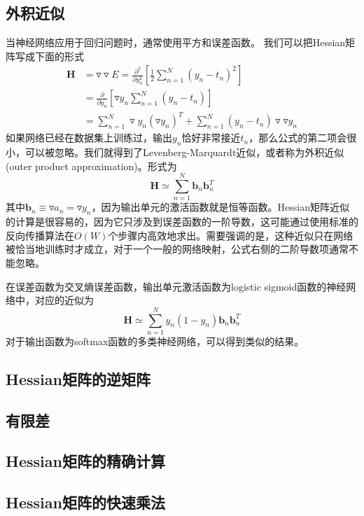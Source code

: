 \subsection*{外积近似}
当神经网络应用于回归问题时，通常使用平方和误差函数。
我们可以把Hessian矩阵写成下面的形式
\begin{equation}
	\begin{aligned}
		\boldsymbol{H}&=\triangledown\triangledown E=\frac{\partial^2}{\partial y_n^2}\left[\frac{1}{2}\sum_{n=1}^{N}(y_n-t_n)^2 \right]\\
		&=\frac{\partial}{\partial y_n}\left[\triangledown y_n\sum_{n=1}^{N}(y_n-t_n) \right]\\
		&=\sum_{n=1}^{N}\triangledown y_n(\triangledown y_n)^T+\sum_{n=1}^{N}(y_n-t_n)\triangledown\triangledown y_n
	\end{aligned}
\end{equation}
如果网络已经在数据集上训练过，输出$y_n$恰好非常接近$t_n$，那么公式的第二项会很小，可以被忽略。我们就得到了Levenberg-Marquardt近似，或者称为外积近似(outer product approximation)。形式为
\begin{equation}
	\boldsymbol{H}\simeq \sum_{n=1}^{N}\boldsymbol{b}_n\boldsymbol{b}_n^T
\end{equation}
其中$\boldsymbol{b}_n\equiv \triangledown a_n=\triangledown y_n$，因为输出单元的激活函数就是恒等函数。Hessian矩阵近似的计算是很容易的，因为它只涉及到误差函数的一阶导数，这可能通过使用标准的反向传播算法在$O(W)$个步骤内高效地求出。需要强调的是，这种近似只在网络被恰当地训练时才成立，对于一个一般的网络映射，公式右侧的二阶导数项通常不能忽略。

在误差函数为交叉熵误差函数，输出单元激活函数为logistic sigmoid函数的神经网络中，对应的近似为
\begin{equation}
	\boldsymbol{H}\simeq \sum_{n=1}^{N}y_n(1-y_n)\boldsymbol{b}_n\boldsymbol{b}_n^T
\end{equation}
对于输出函数为softmax函数的多类神经网络，可以得到类似的结果。
\subsection*{Hessian矩阵的逆矩阵}
\subsection*{有限差}
\subsection*{Hessian矩阵的精确计算}
\subsection*{Hessian矩阵的快速乘法}